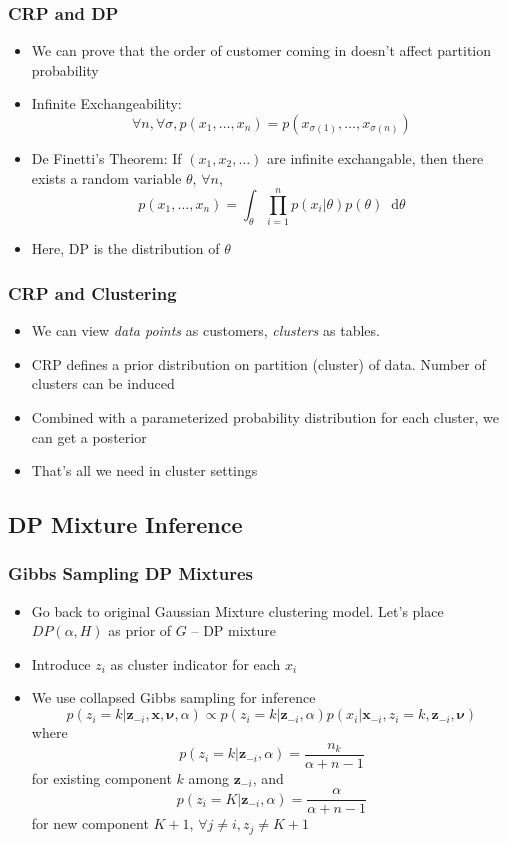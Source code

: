 \documentclass{beamer}
\newcommand*\diff{\mathop{}\!\mathrm{d}}
\begin{document}
\begin{frame}
	\frametitle{CRP and DP}
	\begin{itemize}
		\item We can prove that the order of customer coming in doesn't affect partition probability
		\item Infinite Exchangeability:
			\[
			\forall n, \forall \sigma, p(x_1, \ldots, x_n)=p(x_{\sigma(1)},\ldots, x_{\sigma(n)})
			\]
		\item De Finetti’s Theorem: If $(x_1, x_2, \ldots)$ are infinite exchangable, then there exists a random variable $\theta$, $\forall n$, 
			\[
			 p(x_1, \ldots, x_n) = \int_{\theta} \prod_{i=1}^n p(x_i|\theta)p(\theta) \diff \theta
			\]		
		\item Here, DP is the distribution of $\theta$	
	\end{itemize}
\end{frame}

\begin{frame}
	\frametitle{CRP and Clustering}
	\begin{itemize}
		\item We can view {\em data points} as customers, {\em clusters} as tables.
		\item CRP defines a prior distribution on partition (cluster) of data. Number of clusters can be induced
		\item Combined with a parameterized probability distribution for each cluster, we can get a posterior
		\item That's all we need in cluster settings
	\end{itemize}
\end{frame}

\subsection{DP Mixture Inference}

\begin{frame}
	\frametitle{Gibbs Sampling DP Mixtures}
	\begin{itemize}
		\item Go back to original Gaussian Mixture clustering model. Let's place $DP(\alpha,H)$ as prior of $G$ -- DP mixture
		\item Introduce $z_i$ as cluster indicator for each $x_i$
		\item We use {\color{red} collapsed} Gibbs sampling for inference
		\[
			p(z_i=k|\bm{z}_{-i},\bm{x},\bm{\nu},\alpha) \propto p(z_i=k|\bm{z}_{-i}, \alpha)p(x_i|\bm{x}_{-i}, z_i=k, \bm{z}_{-i}, \bm{\nu})
		\]
		where \[
			p(z_i=k|\bm{z}_{-i}, \alpha) = \frac{n_k}{\alpha+n-1}
		\] for existing component $k$ among $\bm{z}_{-i}$, and 
		\[
			p(z_i=K|\bm{z}_{-i}, \alpha) = \frac{\alpha}{\alpha+n-1}
		\] for new component $K+1$, $\forall j \neq i, z_j \neq K+1$
	\end{itemize}
\end{frame}
\end{document}
